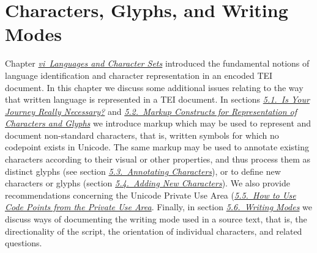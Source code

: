 
\section[{Characters, Glyphs, and Writing Modes}]{Characters, Glyphs, and Writing Modes}\label{WD}\par
Chapter \textit{\hyperref[CH]{vi\ Languages and Character Sets}} introduced the fundamental notions of language identification and character representation in an encoded TEI document. In this chapter we discuss some additional issues relating to the way that written language is represented in a TEI document. In sections \textit{\hyperref[WDNE]{5.1.\ Is Your Journey Really Necessary?}} and \textit{\hyperref[D25-20]{5.2.\ Markup Constructs for Representation of Characters and Glyphs}} we introduce markup which may be used to represent and document non-standard characters, that is, written symbols for which no codepoint exists in Unicode. The same markup may be used to annotate existing characters according to their visual or other properties, and thus process them as distinct glyphs (see section \textit{\hyperref[D25-30]{5.3.\ Annotating Characters}}), or to define new characters or glyphs (section \textit{\hyperref[D25-40]{5.4.\ Adding New Characters}}). We also provide recommendations concerning the Unicode Private Use Area (\textit{\hyperref[D25-50]{5.5.\ How to Use Code Points from the Private Use Area}}. Finally, in section \textit{\hyperref[WDWM]{5.6.\ Writing Modes}} we discuss ways of documenting the writing mode used in a source text, that is, the directionality of the script, the orientation of individual characters, and related questions.
